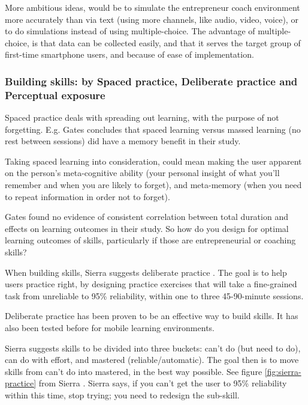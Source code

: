   More ambitious ideas, would be to simulate the entrepreneur coach environment more accurately than via text (using more channels, like audio, video, voice), or to do simulations instead of using multiple-choice. The advantage of multiple-choice, is that data can be collected easily, and that it serves the target group of first-time smartphone users, and because of ease of implementation.

  \subsubsection{Building skills: by Spaced practice, Deliberate practice and Perceptual exposure}

  Spaced practice deals with spreading out learning, with the purpose of not forgetting. E.g. Gates \cite{Gates} concludes that spaced learning versus massed learning (no rest between sessions) did have a memory benefit in their study.

  Taking spaced learning into consideration, could mean making the user apparent on the person's meta-cognitive ability (your personal insight of what you'll remember and when you are likely to forget), and meta-memory (when you need to repeat information in order not to forget).

  Gates \cite{Gates} found no evidence of consistent correlation between total duration and effects on learning outcomes in their study. So how do you design for optimal learning outcomes of skills, particularly if those are entrepreneurial or coaching skills?

  When building skills, Sierra suggests deliberate practice \cite{yengin} \cite{sierra}. The goal is to help users practice right, by designing practice exercises that will take a fine-grained task from unreliable to 95\% reliability, within one to three 45-90-minute sessions.

  Deliberate practice has been proven to be an effective way to build skills. It has also been tested before for mobile learning environments. \cite{yengin}

  Sierra \cite{sierra} suggests skills to be divided into three buckets: can't do (but need to do), can do with effort, and mastered (reliable/automatic). The goal then is to move skills from can't do into mastered, in the best way possible. See figure \ref{fig:sierra-practice} from Sierra \cite{sierra}. Sierra says, if you can’t get the user to 95\% reliability within this time, stop trying; you need to redesign the sub-skill. \cite{sierra}

